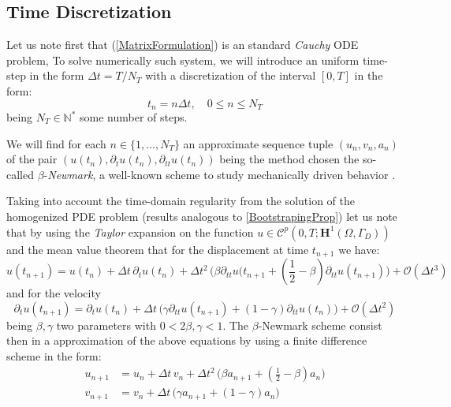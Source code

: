 \subsection{Time Discretization}
Let us note first that (\ref{MatrixFormulation}) is an standard \textit{Cauchy} ODE problem, To solve numerically such system, we will introduce an uniform time-step in the form $\Delta t = T/N_T$ with a discretization of the interval $[0, T]$ in the form:
\begin{equation*}
    t_n = n \Delta t, \quad 0 \leq n \leq N_T
\end{equation*}
being $N_T \in \mathbb{N}^*$ some number of steps.

We will find for each $n \in \{1,\dots, N_T \}$ an approximate sequence tuple $(u_n, v_n, a_n)$ of the pair $(u(t_n), \partial_{t} u(t_n), \partial_{tt} u(t_n))$ being the method chosen the so-called $\beta$-\textit{Newmark}, a well-known scheme to study mechanically driven behavior \cite{raviart1983introduction}.

Taking into account the time-domain regularity from the solution of the homogenized PDE problem (results analogous to \ref{BootstrapingProp}) let us note that by using the \textit{Taylor} expansion on the function $u \in \mathcal{C}^{p}(0,T;\mathbf{H}^1(\Omega, \Gamma_D))$ and the mean value theorem that for the displacement at time $t_{n+1}$ we have:
\begin{equation*}
    u(t_{n+1}) = u(t_n) + \Delta t \, \partial_{t} u(t_n) + \Delta t^2 \, \big( \beta \partial_{tt} u(t_{n+1} + (\frac{1}{2} - \beta) \partial_{tt} u(t_{n+1}) \big) + \mathcal{O}(\Delta t^3)    
\end{equation*}
and for the velocity
\begin{equation*}
    \partial_{t} u(t_{n+1}) = \partial_{t} u (t_{n}) + \Delta t \, \big( \gamma \partial_{tt} u(t_{n+1}) + (1-\gamma) \partial_{tt} u(t_n) \big) + \mathcal{O}(\Delta t^2)
\end{equation*}
being $\beta, \gamma$ two parameters with $0 < 2\beta, \gamma < 1$.
The $\beta$-Newmark scheme consist then in a approximation of the above equations by using a finite difference scheme in the form:
\begin{align}
    \label{TimeDif-Scheme}
    u_{n+1} &= u_{n} + \Delta t\, v_{n} + \Delta t^2 \, \big( \beta a_{n+1} + (\frac{1}{2} - \beta) a_n \big) \\
    v_{n+1} &= v_n + \Delta t\, \big( \gamma a_{n+1} + (1-\gamma) a_{n} \big)
\end{align}

